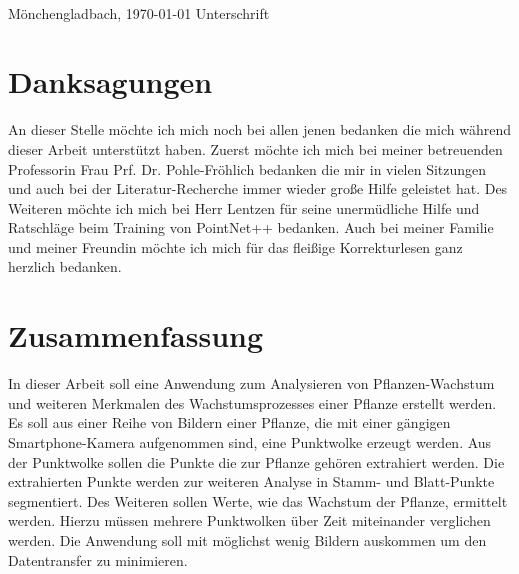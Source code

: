 \documentclass[12pt,titlepage, twoside]{article}
\begin{document}
\vspace{8ex}
\begin{tabbing}
\underline{\hspace{16em}} \hspace{3em}\= \underline{\hspace{14em}} \\
Mönchengladbach, \today \> Unterschrift
\end{tabbing}

\newpage


\section*{Danksagungen}

An dieser Stelle möchte ich mich noch bei allen jenen bedanken die mich während dieser Arbeit unterstützt haben.
Zuerst möchte ich mich bei meiner betreuenden Professorin Frau Prf. Dr. Pohle-Fröhlich bedanken die mir in vielen Sitzungen und auch bei der Literatur-Recherche immer wieder große Hilfe geleistet hat.
Des Weiteren möchte ich mich bei Herr Lentzen für seine unermüdliche Hilfe und Ratschläge beim Training von PointNet++ bedanken.
Auch bei meiner Familie und meiner Freundin möchte ich mich für das fleißige Korrekturlesen ganz herzlich bedanken.

\newpage
\section*{Zusammenfassung}
In dieser Arbeit soll eine Anwendung zum Analysieren von Pflanzen-Wachstum und weiteren Merkmalen des Wachstumsprozesses einer Pflanze erstellt werden. 
Es soll aus einer Reihe von Bildern einer Pflanze, die mit einer gängigen Smartphone-Kamera aufgenommen sind, eine Punktwolke erzeugt werden. 
Aus der Punktwolke sollen die Punkte die zur Pflanze gehören extrahiert werden. 
Die extrahierten Punkte werden zur weiteren Analyse in Stamm- und Blatt-Punkte segmentiert.
Des Weiteren sollen Werte, wie das Wachstum der Pflanze, ermittelt werden. Hierzu müssen mehrere Punktwolken über Zeit miteinander verglichen werden.
Die Anwendung soll mit möglichst wenig Bildern auskommen um den Datentransfer zu minimieren.

\setcounter{page}{1}
\end{document}

